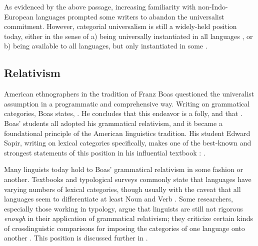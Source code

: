 As evidenced by the above passage, increasing familiarity with non-Indo-European languages prompted some writers to abandon the universalist commitment. However, categorial universalism is still a widely-held position today, either in the sense of a) being universally instantiated in all languages , or b) being available to all languages, but only instantiated in some .

\subsection{Relativism}
\label{sec:2.2.2}

American ethnographers in the tradition of Franz Boas questioned the univeralist assumption in a programmatic and comprehensive way. Writing on grammatical categories, Boas states, . He concludes that this endeavor is a folly, and that . Boas' students all adopted his grammatical relativism, and it became a foundational principle of the American linguistics tradition. His student Edward Sapir, writing on lexical categories specifically, makes one of the best-known and strongest statements of this position in his influential textbook : .

Many linguists today hold to Boas' grammatical relativism in some fashion or another. Textbooks and typological surveys commonly state that languages have varying numbers of lexical categories, though usually with the caveat that all languages seem to differentiate at least Noun and Verb \parencite[e.g.][§6.2]{Velupillai2012}. Some researchers, especially those working in typology, argue that linguists are still not rigorous \emph{enough} in their application of grammatical relativism; they criticize certain kinds of crosslinguistic comparisons for imposing the categories of one language onto another \parencites{Croft2001}{Haspelmath2010}{LaPolla2016} . This position is discussed further in .

